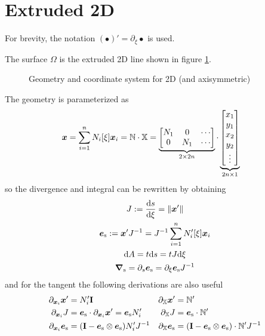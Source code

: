 \documentclass[a4paper,11pt]{article}
\newcommand{\ta}[1]{\text{\boldmath $#1$}} %
\newcommand{\ts}[1]{\text{\boldmath $\mathrm{#1}$}} %
\newcommand{\uv}[1]{\mathbb{#1}}
\newcommand{\um}[1]{\mathbb{#1}}
\newcommand{\dif}[1]{\mathrm{d}#1}
\newcommand{\diff}{\ta{\nabla}}
\newcommand{\pderiv}[2]{\partial_{#2} #1}
\newcommand{\dderiv}[2]{\frac{\mathrm{d}#1}{\mathrm{d}#2}}
\newcommand{\norm}[1]{\left\lVert{#1}\right\rVert}
\newcommand{\surf}{\mathrm{s}}
\newcommand{\defeq}{:=}
\begin{document}
\section{Extruded 2D}
For brevity, the notation $(\bullet)' = \pderiv{\bullet}{\xi}$ is used.

The surface $\Omega$ is the extruded 2D line shown in figure \ref{fig:extruded}.
\begin{figure}[htpb]
 \centering
 \caption{Geometry and coordinate system for 2D (and axisymmetric)}
 \label{fig:extruded}
\end{figure}

The geometry is parameterized as
\begin{align}
 \ta x &= \sum_{i=1}^n N_i[\xi]\ta x_i
  = \um N \cdot \uv X
  = \underbrace{\begin{bmatrix}N_1 & 0 & \cdots\\ 0 & N_1 & \cdots \end{bmatrix}}_{2\times 2n}\cdot \underbrace{\begin{bmatrix}x_1\\y_1\\x_2\\y_2\\ \vdots\end{bmatrix}}_{2n\times 1}
\end{align}
so the divergence and integral can be rewritten by obtaining
\begin{gather}
 J \defeq \dderiv{s}{\xi} = \norm{\ta x'}\\
 \ta e_\surf \defeq \ta x' J^{-1} = J^{-1}\sum_{i=1}^n N_i'[\xi] \ta x_i\\
 \dif A = t \dif s = t J \dif \xi     \label{eq:intdA_2d}\\
 \diff_\surf = \pderiv{}{s}\ta e_\surf = \pderiv{}{\xi}\ta e_\surf J^{-1}    \label{eq:nabla_surf_2d}
\end{gather}
and for the tangent the following derivations are also useful
\begin{align}
 \pderiv{\ta x'}{\ta x_i} &= N_i' \ts I & \pderiv{\ta x'}{\uv X} &= \um N'\\
 \pderiv{J}{\ta x_i} &= \ta e_\surf \cdot \pderiv{\ta x'}{\ta x_i} = \ta e_\surf N_i'  & \pderiv{J}{\uv X} &= \ta e_\surf\cdot \um N' \\
 \pderiv{\ta e_\surf}{\ta x_i} &= (\ts I - \ta e_\surf\otimes\ta e_\surf)N_i' J^{-1} &  \pderiv{\ta e_\surf}{\uv X} &= (\ts I - \ta e_\surf\otimes \ta e_\surf)\cdot \um N' J^{-1}
\end{align}
\end{document}
